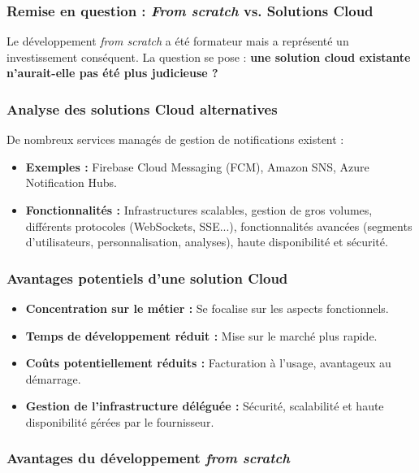 \subsubsection{Remise en question : {\it From scratch} vs. Solutions Cloud}

Le développement {\it from scratch} a été formateur mais a représenté un investissement conséquent. La question se pose : {\bf une solution cloud existante n'aurait-elle pas été plus judicieuse ?}

\subsubsection{Analyse des solutions Cloud alternatives}

De nombreux services managés de gestion de notifications existent :

\begin{itemize}
\item {\bf Exemples : } Firebase Cloud Messaging (FCM), Amazon SNS, Azure
Notification Hubs.
\item {\bf Fonctionnalités : } Infrastructures scalables, gestion de gros
volumes, différents protocoles (WebSockets, SSE...), fonctionnalités avancées
(segments d'utilisateurs, personnalisation, analyses), haute disponibilité et
sécurité.
\end{itemize}

\subsubsection{Avantages potentiels d'une solution Cloud}

\begin{itemize}
\item {\bf Concentration sur le métier : } Se focalise sur les aspects fonctionnels.
\item {\bf Temps de développement réduit : } Mise sur le marché plus rapide.
\item {\bf Coûts potentiellement réduits : } Facturation à l'usage, avantageux
au démarrage.
\item {\bf Gestion de l'infrastructure déléguée : } Sécurité, scalabilité et
haute disponibilité gérées par le fournisseur.
\end{itemize}

\subsubsection{Avantages du développement {\it from scratch}}

